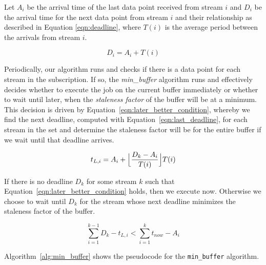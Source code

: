 Let $A_{i}$ be the arrival time of the last data point received from stream $i$ and $D_{i}$ be the arrival time for the next data point from stream $i$
and their relationship as described in Equation \ref{eqn:deadline}, where $T(i)$ is the average period between the arrivals from stream $i$.

\begin{equation}
D_{i} = A_{i} + T(i)
\label{eqn:deadline}
\end{equation}


Periodically, our algorithm runs and checks if there is a data point for each stream in the subscription.  If so, the \emph{min\_buffer} algorithm runs 
and effectively decides whether to execute the job on the current buffer immediately or whether to wait until later, when the \emph{staleness factor} of
the buffer will be at a minimum.  This decision is driven by Equation~\ref{eqn:later_better_condition}, whereby we find the next deadline, computed with
Equation~\ref{eqn:last_deadline}, for each stream in the set and determine the staleness factor will be for the entire buffer if we wait until that deadline arrives.

\begin{equation}
t_{L,i} = A_{i} + \Bigl\lfloor \frac{D_{k}-A_{i}}{T(i)} \Bigr\rfloor T(i)
\label{eqn:last_deadline}
\end{equation}

If there is no deadline $D_{k}$ for some stream $k$ such that Equation~\ref{eqn:later_better_condition} holds, then we execute now.  Otherwise we choose to wait
until $D_{k}$ for the stream whose next deadline minimizes the staleness factor of the buffer.


\begin{equation}
\sum_{i=1}^{k-1} D_{k} - t_{L,i} < \sum_{i=1}^{k} t_{now} - A_{i}
\label{eqn:later_better_condition}
\end{equation}

Algorithm~\ref{alg:min_buffer} shows the pseudocode for the \texttt{min\_buffer} algorithm.


